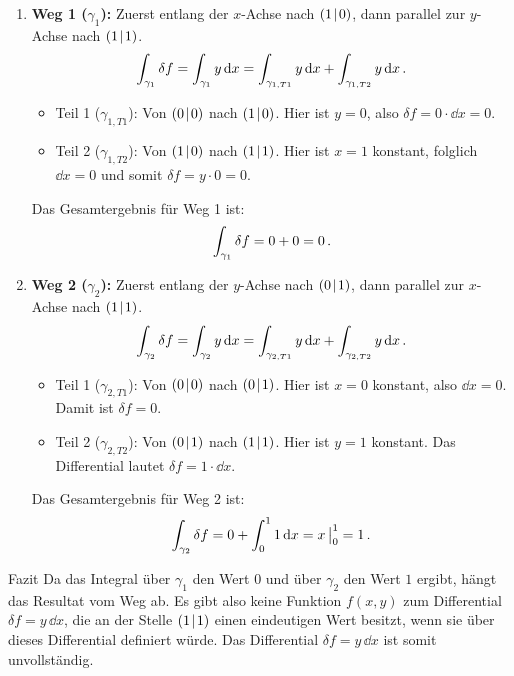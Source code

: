 \begin{enumerate}
    \item \textbf{Weg 1 ($\gamma_1$):} Zuerst entlang der $x$-Achse nach $(1\!\mid\! 0)$, dann parallel zur $y$-Achse nach $(1\!\mid\! 1)$.
    \begin{equation}
        \int_{\gamma_1} \delta f = \int_{\gamma_1} y \, \mathrm{d} x = \int_{\gamma_{1,T1}} y \, \mathrm{d} x + \int_{\gamma_{1,T2}} y \, \mathrm{d} x \,.
    \end{equation}
    \begin{itemize}
        \item Teil 1 ($\gamma_{1,T1}$): Von $(0\!\mid\! 0)$ nach $(1\!\mid\! 0)$. Hier ist $y = 0$, also $\delta f = 0 \cdot \dd x = 0$.
        \item Teil 2 ($\gamma_{1,T2}$): Von $(1\!\mid\! 0)$ nach $(1\!\mid\! 1)$. Hier ist $x = 1$ konstant, folglich $\dd x = 0$ und somit $\delta f = y \cdot 0 = 0$.
    \end{itemize}
    Das Gesamtergebnis für Weg 1 ist:
    \begin{equation}\label{eq: integral_weg1}
        \int_{\gamma_1} \delta f = 0 + 0 = 0 \,.
    \end{equation}

    \item \textbf{Weg 2 ($\gamma_2$):} Zuerst entlang der $y$-Achse nach $(0\!\mid\! 1)$, dann parallel zur $x$-Achse nach $(1\!\mid\! 1)$.
    \begin{equation}
    \int_{\gamma_2} \delta f = \int_{\gamma_2} y \, \mathrm{d} x = \int_{\gamma_{2,T1}} y \, \mathrm{d} x + \int_{\gamma_{2,T2}} y \, \mathrm{d} x \,.
\end{equation}
    \begin{itemize}
        \item Teil 1 ($\gamma_{2,T1}$): Von $(0\!\mid\! 0)$ nach $(0\!\mid\! 1)$. Hier ist $x = 0$ konstant, also $\dd x = 0$. Damit ist $\delta f = 0$.
        \item Teil 2 ($\gamma_{2,T2}$): Von $(0\!\mid\! 1)$ nach $(1\!\mid\! 1)$. Hier ist $y = 1$ konstant. Das Differential lautet $\delta f = 1 \cdot \dd x$.
    \end{itemize}
    Das Gesamtergebnis für Weg 2 ist:
    \begin{equation}\label{eq: integral_weg2}
        \int_{\gamma_2} \delta f = 0 + \int_0^1 1 \, \mathrm{d} x = x\,\big|_0^1 = 1 \,.
    \end{equation}
\end{enumerate}

\begin{rememberbox}{Fazit}
    Da das Integral über $\gamma_1$ den Wert $0$ und über $\gamma_2$ den Wert $1$ ergibt, hängt das Resultat vom Weg ab. Es gibt also keine Funktion $f(x,y)$ zum Differential $\delta f = y \, \dd x$, die an der Stelle $(1\!\mid\! 1)$ einen eindeutigen Wert besitzt, wenn sie über dieses Differential definiert würde. Das Differential $\delta f = y \, \dd x$ ist somit unvollständig.
\end{rememberbox}



